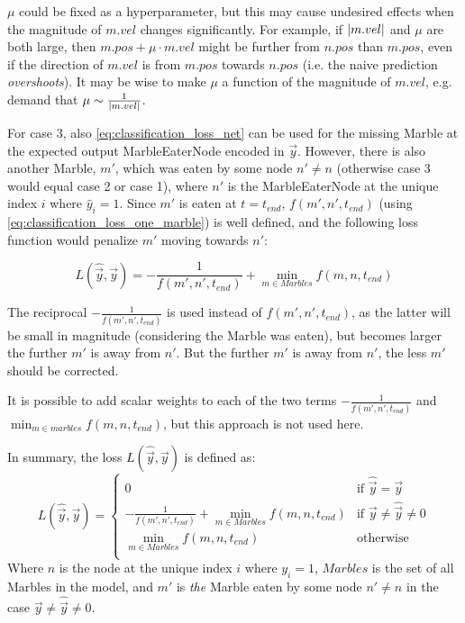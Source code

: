 $\mu$ could be fixed as a hyperparameter, but this may cause undesired effects when the  magnitude of $m.vel$ changes significantly. For example, if $\lvert m.vel \rvert$ and $\mu$ are both large, then $m.pos + \mu \cdot m.vel$ might be further from $n.pos$ than $m.pos$, even if the direction of $m.vel$ is from $m.pos$ towards $n.pos$ (i.e. the naive prediction \textit{overshoots}). It may be wise to make $\mu$ a function of the magnitude of $m.vel$, e.g. demand that $\mu \sim \frac{1}{\lvert m.vel \rvert}$.

For case 3, also \eqref{eq:classification_loss_net} can be used for the missing Marble at the expected output MarbleEaterNode encoded in $\vec{y}$. However, there is also another Marble, $m'$, which was eaten by some node $n' \neq n$ (otherwise case 3 would equal case 2 or case 1), where $n'$ is the MarbleEaterNode at the unique index $i$ where $\hat{y}_i = 1$. Since $m'$ is eaten at $t = t_{end}$, $f(m', n', t_{end})$ (using \eqref{eq:classification_loss_one_marble}) is well defined, and the following loss function would penalize $m'$ moving towards $n'$:

\begin{equation}
    L(\hat{\vec{y}}, \vec{y}) = - \frac{1}{f(m', n', t_{end})} + \min_{m \in Marbles} f(m, n, t_{end})
\end{equation}

The reciprocal $- \frac{1}{f(m', n', t_{end})}$ is used instead of $f(m', n', t_{end})$, as the latter will be small in magnitude (considering the Marble was eaten), but becomes larger the further $m'$ is away from $n'$. But the further $m'$ is away from $n'$, the less $m'$ should be corrected.

It is possible to add scalar weights to each of the two terms $- \frac{1}{f(m', n', t_{end})}$ and $\min_{m \in marbles} f(m, n, t_{end})$, but this approach is not used here.

In summary, the loss $L(\hat{\vec{y}}, \vec{y})$ is defined as:
\begin{equation}
    L(\hat{\vec{y}}, \vec{y}) = \begin{cases}
        0 & \text{if } \hat{\vec{y}} = \vec{y} \\
        - \frac{1}{f(m', n', t_{end})} + \min_{m \in Marbles} f(m, n, t_{end}) & \text{if } \vec{y} \neq \hat{\vec{y}} \neq 0  \\
        \min_{m \in Marbles} f(m, n, t_{end}) & \text{otherwise}\\
    \end{cases}
    \label{eq:classification_loss_full}
\end{equation}
Where $n$ is the node at the unique index $i$ where $y_i = 1$, $Marbles$ is the set of all Marbles in the model, and $m'$ is \textit{the} Marble eaten by some node $n' \neq n$ in the case $\vec{y} \neq \hat{\vec{y}} \neq 0$.

